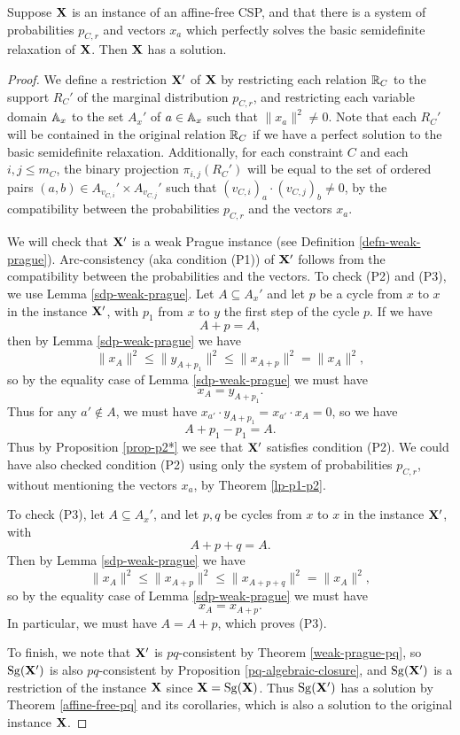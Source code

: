 \documentclass[letterpaper,11pt]{article}
\DeclareMathOperator{\Sg}{Sg}
\begin{document}
\begin{thm} Suppose $\mathbf{X}$ is an instance of an affine-free CSP, and that there is a system of probabilities $p_{C,r}$ and vectors $x_a$ which perfectly solves the basic semidefinite relaxation of $\mathbf{X}$. Then $\mathbf{X}$ has a solution.
\end{thm}
\begin{proof} We define a restriction $\mathbf{X}'$ of $\mathbf{X}$ by restricting each relation $\mathbb{R}_C$ to the support $R_C'$ of the marginal distribution $p_{C,r}$, and restricting each variable domain $\mathbb{A}_x$ to the set $A_x'$ of $a \in \mathbb{A}_x$ such that $\|x_a\|^2 \ne 0$. Note that each $R_C'$ will be contained in the original relation $\mathbb{R}_C$ if we have a perfect solution to the basic semidefinite relaxation. Additionally, for each constraint $C$ and each $i,j \le m_C$, the binary projection $\pi_{i,j}(R_C')$ will be equal to the set of ordered pairs $(a,b) \in A_{v_{C,i}}' \times A_{v_{C,j}}'$ such that $(v_{C,i})_a \cdot (v_{C,j})_b \ne 0$, by the compatibility between the probabilities $p_{C,r}$ and the vectors $x_a$.

We will check that $\mathbf{X}'$ is a weak Prague instance (see Definition \ref{defn-weak-prague}). Arc-consistency (aka condition (P1)) of $\mathbf{X}'$ follows from the compatibility between the probabilities and the vectors. To check (P2) and (P3), we use Lemma \ref{sdp-weak-prague}. Let $A \subseteq A_x'$ and let $p$ be a cycle from $x$ to $x$ in the instance $\mathbf{X}'$, with $p_1$ from $x$ to $y$ the first step of the cycle $p$. If we have
\[
A+p = A,
\]
then by Lemma \ref{sdp-weak-prague} we have
\[
\|x_A\|^2 \le \|y_{A+p_1}\|^2 \le \|x_{A+p}\|^2 = \|x_A\|^2,
\]
so by the equality case of Lemma \ref{sdp-weak-prague} we must have
\[
x_A = y_{A+p_1}.
\]
Thus for any $a' \not\in A$, we must have $x_{a'} \cdot y_{A+p_1} = x_{a'} \cdot x_A = 0$, so we have
\[
A+p_1-p_1 = A.
\]
Thus by Proposition \ref{prop-p2*} we see that $\mathbf{X}'$ satisfies condition (P2). We could have also checked condition (P2) using only the system of probabilities $p_{C,r}$, without mentioning the vectors $x_a$, by Theorem \ref{lp-p1-p2}.

To check (P3), let $A \subseteq A_x'$, and let $p,q$ be cycles from $x$ to $x$ in the instance $\mathbf{X}'$, with
\[
A+p+q = A.
\]
Then by Lemma \ref{sdp-weak-prague} we have
\[
\|x_A\|^2 \le \|x_{A+p}\|^2 \le \|x_{A+p+q}\|^2 = \|x_A\|^2,
\]
so by the equality case of Lemma \ref{sdp-weak-prague} we must have
\[
x_A = x_{A+p}.
\]
In particular, we must have $A = A+p$, which proves (P3).

To finish, we note that $\mathbf{X}'$ is $pq$-consistent by Theorem \ref{weak-prague-pq}, so $\Sg(\fX')$ is also $pq$-consistent by Proposition \ref{pq-algebraic-closure}, and $\Sg(\fX')$ is a restriction of the instance $\mathbf{X}$ since $\fX = \Sg(\fX)$. Thus $\Sg(\fX')$ has a solution by Theorem \ref{affine-free-pq} and its corollaries, which is also a solution to the original instance $\mathbf{X}$.
\end{proof}
\end{document}
